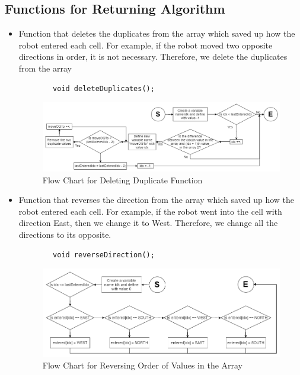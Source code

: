 \documentclass[11pt]{article}
\begin{document}

\subsection{Functions for Returning Algorithm}
\begin{itemize}
\item Function that deletes the duplicates from the array which saved up how the robot entered each cell. For example, if the robot moved two opposite directions in order, it is not necessary. Therefore, we delete the duplicates from the array
 	\begin{verbatim}
		void deleteDuplicates();
	\end{verbatim}
\begin{figure}[htp]
\centering
\includegraphics[scale=0.50]{images/Software_Flowchart/deleteDuplicate.png}
\caption{Flow Chart for Deleting Duplicate Function}
\label{}
\end{figure}
\item Function that reverses the direction from the array which saved up how the robot entered each cell. For example, if the robot went into the cell with direction East, then we change it to West. Therefore, we change all the directions to its opposite.
 	\begin{verbatim}
		void reverseDirection();
	\end{verbatim}
\begin{figure}[htp]
\centering
\includegraphics[scale=0.50]{images/Software_Flowchart/reverseDirection.png}
\caption{Flow Chart for Reversing Order of Values in the Array}
\label{}
\end{figure}

\end{itemize}
\end{document}
